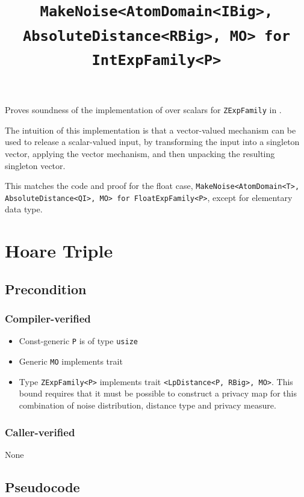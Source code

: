 \documentclass{article}
\title{\texttt{MakeNoise<AtomDomain<IBig>, AbsoluteDistance<RBig>, MO> for IntExpFamily<P>}}
\author{\MichaelShoemateAuthor}
\date{}
\begin{document}
\maketitle

\contrib
Proves soundness of the implementation of  over scalars
for \texttt{ZExpFamily} in .

The intuition of this implementation is that a vector-valued mechanism can be used to release a scalar-valued input,
by transforming the input into a singleton vector,
applying the vector mechanism, and then unpacking the resulting singleton vector.

This matches the code and proof for the float case, \texttt{MakeNoise<AtomDomain<T>, AbsoluteDistance<QI>, MO> for FloatExpFamily<P>},
except for elementary data type.

\section{Hoare Triple}
\subsection*{Precondition}
\subsubsection*{Compiler-verified}

\begin{itemize}
    \item Const-generic \texttt{P} is of type \texttt{usize}
    \item Generic \texttt{MO} implements trait 
    \item Type \texttt{ZExpFamily<P>} implements trait \texttt{<LpDistance<P, RBig>, MO>}.
        This bound requires that it must be possible to construct a privacy map for this combination of noise distribution, distance type and privacy measure.
\end{itemize}

\subsubsection*{Caller-verified}
None

\subsection*{Pseudocode}

\end{document}
